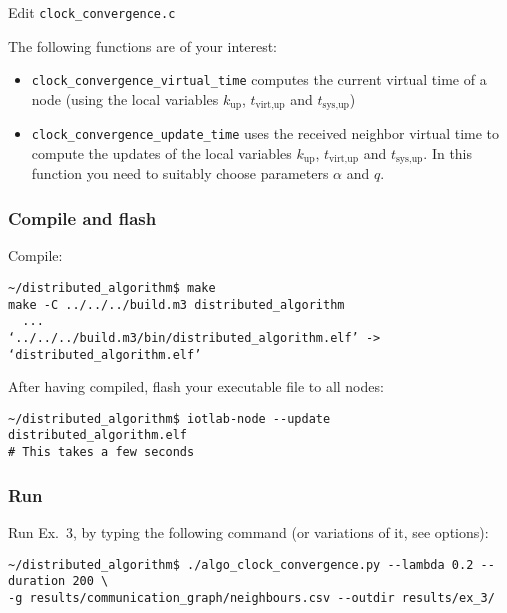 \documentclass[oneside]{article}
\begin{document}
Edit \verb=clock_convergence.c=

The following functions are of your interest:
\begin{itemize}
	\item \verb=clock_convergence_virtual_time= computes the current virtual time of a node
        (using the local variables $k_{\text{up}}$, $t_{\text{virt},\text{up}}$ and $t_{\text{sys},\text{up}}$)
	\item \verb=clock_convergence_update_time= uses the received neighbor virtual time
        to compute the updates of the local variables
        $k_{\text{up}}$, $t_{\text{virt},\text{up}}$ and $t_{\text{sys},\text{up}}$.
        In this function you need to suitably choose parameters $\alpha$ and $q$.
\end{itemize}

\subsubsection{Compile and flash}

Compile:
    \begin{verbatim}~/distributed_algorithm$ make
make -C ../../../build.m3 distributed_algorithm
  ...
‘../../../build.m3/bin/distributed_algorithm.elf’ -> ‘distributed_algorithm.elf’
\end{verbatim}

After having compiled, flash your executable file to all nodes:
    \begin{verbatim}~/distributed_algorithm$ iotlab-node --update distributed_algorithm.elf
# This takes a few seconds
\end{verbatim}

\subsubsection{Run} %

Run Ex.~3, by typing the following command (or variations of it, see options):

\begin{verbatim}
~/distributed_algorithm$ ./algo_clock_convergence.py --lambda 0.2 --duration 200 \
-g results/communication_graph/neighbours.csv --outdir results/ex_3/
\end{verbatim}
\end{document}
